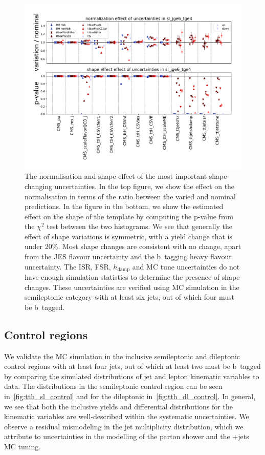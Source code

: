 \begin{figure}
\begin{centering}
\includegraphics[width=1.0\textwidth]{figures/tth/uncs_sl_jge6_tge4.pdf}
\caption[The normalisation and shape effect of uncertainties]{The normalisation and shape effect of the most important shape-changing uncertainties. In the top figure, we show the effect on the normalisation in terms of the ratio between the varied and nominal predictions. In the figure in the bottom, we show the estimated effect on the shape of the template by computing the p-value from the $\chi^2$ test between the two histograms. We see that generally the effect of shape variations is symmetric, with a yield change that is under 20\%. Most shape changes are consistent with no change, apart from the JES flavour uncertainty and the b~tagging heavy flavour uncertainty. The ISR, FSR, $h_{\mathrm{damp}}$ and MC tune uncertainties do not have enough simulation statistics to determine the presence of shape changes. These uncertainties are verified using MC simulation in the semileptonic category with at least six jets, out of which four must be b~tagged.}
\label{fig:tth_uncertainties_effect}
\end{centering}
\end{figure}

\subsection{Control regions}
We validate the MC simulation in the inclusive semileptonic and dileptonic control regions with at least four jets, out of which at least two must be b~tagged by comparing the simulated distributions of jet and lepton kinematic variables to data. The distributions in the semileptonic control region can be seen in~\cref{fig:tth_sl_control} and for the dileptonic in~\cref{fig:tth_dl_control}. In general, we see that both the inclusive yields and differential distributions for the kinematic variables are well-described within the systematic uncertainties. We observe a residual mismodeling in the jet multiplicity distribution, which we attribute to uncertainties in the modelling of the parton shower and the \ttbar+jets MC tuning.

